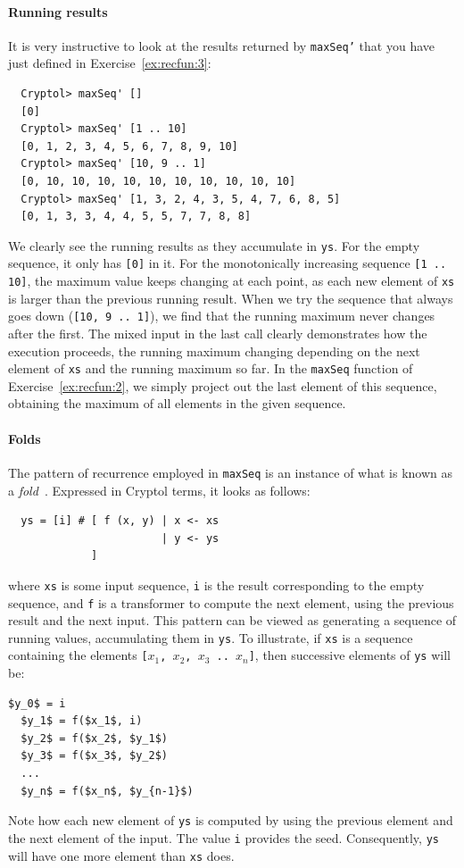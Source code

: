 \paragraph*{Running results} It is very instructive to look at the
results returned by {\tt maxSeq'} that you have just defined in
Exercise~\ref{ex:recfun:3}:
\begin{Verbatim}
  Cryptol> maxSeq' []
  [0]
  Cryptol> maxSeq' [1 .. 10]
  [0, 1, 2, 3, 4, 5, 6, 7, 8, 9, 10]
  Cryptol> maxSeq' [10, 9 .. 1]
  [0, 10, 10, 10, 10, 10, 10, 10, 10, 10, 10]
  Cryptol> maxSeq' [1, 3, 2, 4, 3, 5, 4, 7, 6, 8, 5]
  [0, 1, 3, 3, 4, 4, 5, 5, 7, 7, 8, 8]
\end{Verbatim}
We clearly see the running results as they accumulate in {\tt ys}. For
the empty sequence, it only has {\tt [0]} in it. For the monotonically
increasing sequence {\tt \Verb+[1 .. 10]+}, the maximum value keeps
changing at each point, as each new element of {\tt xs} is larger than
the previous running result. When we try the sequence that always goes
down ({\tt [10, 9 .. 1]}), we find that the running maximum never
changes after the first. The mixed input in the last call clearly
demonstrates how the execution proceeds, the running maximum changing
depending on the next element of {\tt xs} and the running maximum so
far. In the {\tt maxSeq} function of Exercise~\ref{ex:recfun:2}, we
simply project out the last element of this sequence, obtaining the
maximum of all elements in the given sequence.

\paragraph*{Folds}\label{par:fold}\indFold The pattern of recurrence
employed in {\tt maxSeq} is an instance of what is known as a {\em
  fold}~\cite{Bir98}.  Expressed in Cryptol terms, it looks as
follows:
\begin{Verbatim}
  ys = [i] # [ f (x, y) | x <- xs
                        | y <- ys
             ]
\end{Verbatim}
where {\tt xs} is some input sequence, {\tt i} is the result
corresponding to the empty sequence, and {\tt f} is a transformer to
compute the next element, using the previous result and the next
input.  This pattern can be viewed as generating a sequence of running
values, accumulating them in {\tt ys}. To illustrate, if {\tt xs} is a
sequence containing the elements {\tt [$x_1$, $x_2$, $x_3$ .. $x_n$]},
then successive elements of {\tt ys} will be:
\begin{Verbatim}[commandchars=\\\{\}, codes={\catcode`$=3\catcode`^=7\catcode`_=8}]
  $y_0$ = i
  $y_1$ = f($x_1$, i)
  $y_2$ = f($x_2$, $y_1$)
  $y_3$ = f($x_3$, $y_2$)
  ...
  $y_n$ = f($x_n$, $y_{n-1}$)
\end{Verbatim}
Note how each new element of {\tt ys} is computed by using the
previous element and the next element of the input. The value {\tt i}
provides the seed. Consequently, {\tt ys} will have one more element
than {\tt xs} does.

